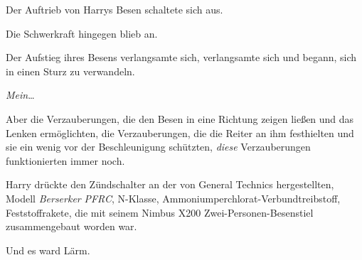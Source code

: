 Der Auftrieb von Harrys Besen schaltete sich aus.

Die Schwerkraft hingegen blieb an.

Der Aufstieg ihres Besens verlangsamte sich, verlangsamte sich und begann, sich in einen Sturz zu verwandeln.

\emph{Mein}…

Aber die Verzauberungen, die den Besen in eine Richtung zeigen ließen und das Lenken ermöglichten, die Verzauberungen, die die Reiter an ihm festhielten und sie ein wenig vor der Beschleunigung schützten, \emph{diese} Verzauberungen funktionierten immer noch.

\emph{}

Harry drückte den Zündschalter an der von General Technics hergestellten, Modell \emph{Berserker} \emph{PFRC}, N-Klasse, Ammoniumperchlorat-Verbundtreibstoff, Feststoffrakete, die mit seinem Nimbus X200 Zwei-Personen-Besenstiel zusammengebaut worden war.

Und es ward Lärm.

